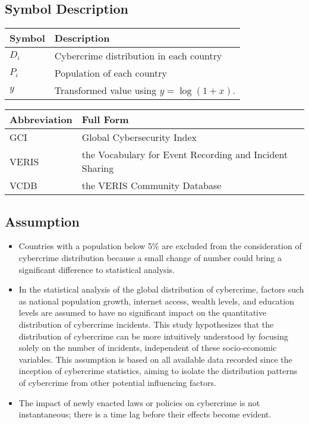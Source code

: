 \subsection{Symbol Description}\label{subsec:symbol-description} %
\begin{tabular}{ll}
    \textbf{Symbol} & \textbf{Description} \\
    \hline
    $D_i$ & Cybercrime distribution in each country \\
    \hline
    $P_i$ & Population of each country \\
    \hline
    $y$   & Transformed value using \( y = \log(1 + x) \). \\
    \hline
\end{tabular}

\medskip

\noindent
\begin{tabular}{ll}
    \textbf{Abbreviation} & \textbf{Full Form} \\
    \hline
    GCI   & Global Cybersecurity Index\cite{gci-2024} \\
    \hline
    VERIS & the Vocabulary for Event Recording and Incident Sharing\cite{veris} \\
    \hline
    VCDB  & the VERIS Community Database\cite{vcdb} \\
    \hline
\end{tabular}
\subsection{Assumption}\label{subsec:assumption} %
\begin{itemize}
    \item Countries with a population below 5\% are excluded from the consideration of cybercrime distribution because
    a small change of number could bring a significant difference to statistical analysis.
    \item In the statistical analysis of the global distribution of cybercrime,
    factors such as national population growth, internet access, wealth levels, and education levels
    are assumed to have no significant impact on the quantitative distribution of cybercrime incidents.
    This study hypothesizes that the distribution of cybercrime can be more intuitively understood by focusing solely on the number of incidents,
    independent of these socio-economic variables.
    This assumption is based on all available data recorded since the inception of cybercrime statistics,
    aiming to isolate the distribution patterns of cybercrime from other potential influencing factors.
    \item The impact of newly enacted laws or policies on cybercrime is not instantaneous;
    there is a time lag before their effects become evident.
\end{itemize}
